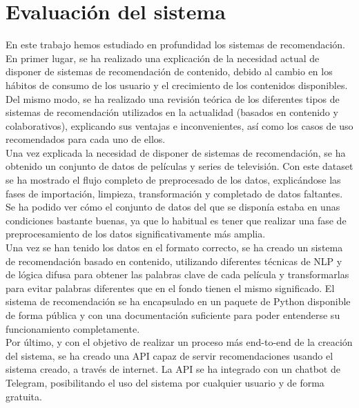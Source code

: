 \chapter{Evaluación del sistema}\label{chap:resultados}

En este trabajo hemos estudiado en profundidad los sistemas de recomendación. En primer lugar, se ha realizado una explicación de la necesidad actual de disponer de sistemas de recomendación de contenido, debido al cambio en los hábitos de consumo de los usuario y el crecimiento de los contenidos disponibles. Del mismo modo, se ha realizado una revisión teórica de los diferentes tipos de sistemas de recomendación utilizados en la actualidad (basados en contenido y colaborativos), explicando sus ventajas e inconvenientes, así como los casos de uso recomendados para cada uno de ellos.\\

Una vez explicada la necesidad de disponer de sistemas de recomendación, se ha obtenido un conjunto de datos de películas y series de televisión. Con este dataset se ha mostrado el flujo completo de preprocesado de los datos, explicándose las fases de importación, limpieza, transformación y completado de datos faltantes. Se ha podido ver cómo el conjunto de datos del que se disponía estaba en unas condiciones bastante buenas, ya que lo habitual es tener que realizar una fase de preprocesamiento de los datos significativamente más amplia.\\

Una vez se han tenido los datos en el formato correcto, se ha creado un sistema de recomendación basado en contenido, utilizando diferentes técnicas de NLP y de lógica difusa para obtener las palabras clave de cada película y transformarlas para evitar palabras diferentes que en el fondo tienen el mismo significado. El sistema de recomendación se ha encapsulado en un paquete de Python disponible de forma pública y con una documentación suficiente para poder entenderse su funcionamiento completamente.\\

Por último, y con el objetivo de realizar un proceso más end-to-end de la creación del sistema, se ha creado una API capaz de servir recomendaciones usando el sistema creado, a través de internet. La API se ha integrado con un chatbot de Telegram, posibilitando el uso del sistema por cualquier usuario y de forma gratuita.\\

